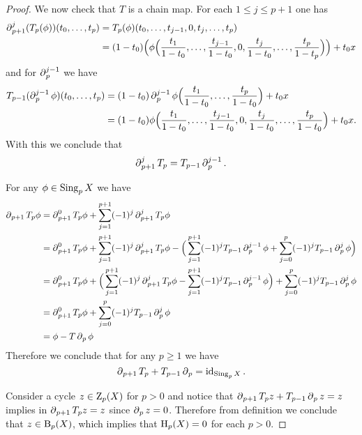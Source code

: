 \begin{proof}
We now check that \(T\) is a chain map. For each
\(1 \leq j \leq p+1\) one has
\begin{align*}
  \operatorname{\partial}_{p+1}^j (T_p(\phi))(t_0, \dots, t_p)
  &= T_p(\phi)(t_0, \dots, t_{j-1}, 0, t_j, \dots, t_p) \\
  &= (1 - t_0) \Big(
      \phi\Big(
      \frac{t_{1}}{1 - t_{0}}, \dots, \frac{t_{j-1}}{1 - t_0}, 0,
      \frac{t_{j}}{1 - t_0}, \dots, \frac{t_{p}}{1 - t_{p}}
      \Big)
    \Big) + t_0 x
\end{align*}
and for \(\operatorname{\partial}_p^{j-1}\) we have
\begin{align*}
  T_{p-1}(\operatorname{\partial}_p^{j-1} \phi)(t_0, \dots, t_{p})
  &= (1 - t_0) \operatorname{\partial}_p^{j-1} \phi\Big(
      \frac{t_{1}}{1 - t_0}, \dots, \frac{t_{p}}{1 - t_{0}}
    \Big) + t_0 x \\
  &= (1 - t_0) \phi\Big(
      \frac{t_{1}}{1 - t_{0}}, \dots, \frac{t_{j-1}}{1 - t_{0}}, 0,
      \frac{t_j}{1 - t_0}, \dots, \frac{t_{p}}{1 - t_0}
    \Big) + t_0 x.
\end{align*}
With this we conclude that
\[
\operatorname{\partial}_{p+1}^j T_p = T_{p-1} \operatorname{\partial}_p^{j-1}.
\]

For any \(\phi \in \operatorname{Sing}_p X\) we have
\begin{align*}
  \operatorname{\partial}_{p+1} T_p \phi
  &= \operatorname{\partial}_{p+1}^0 T_p \phi + \sum_{j=1}^{p+1} (-1)^j \operatorname{\partial}_{p+1}^j T_p \phi \\
  &= \operatorname{\partial}_{p+1}^0 T_p \phi + \sum_{j=1}^{p+1} (-1)^j \operatorname{\partial}_{p+1}^j T_p \phi
    - \Big(
      \sum_{j=1}^{p+1} (-1)^j T_{p-1} \operatorname{\partial}_p^{j-1} \phi
      + \sum_{j=0}^p (-1)^j T_{p-1} \operatorname{\partial}_p^j \phi
    \Big) \\
  &= \operatorname{\partial}_{p+1}^0 T_p \phi + \Big(
      \sum_{j=1}^{p+1} (-1)^j \operatorname{\partial}_{p+1}^j T_p \phi
      - \sum_{j=1}^{p+1} (-1)^j T_{p-1} \operatorname{\partial}_p^{j-1} \phi
    \Big) + \sum_{j=0}^p (-1)^j T_{p-1} \operatorname{\partial}_p^j \phi \\
  &= \operatorname{\partial}_{p+1}^0 T_p \phi + \sum_{j=0}^p (-1)^j T_{p-1} \operatorname{\partial}_p^j \phi \\
  &= \phi - T \operatorname{\partial}_p \phi
\end{align*}
Therefore we conclude that for any \(p \geq 1\) we have
\[
\operatorname{\partial}_{p+1} T_p + T_{p-1} \operatorname{\partial}_p = \operatorname{id}_{\operatorname{Sing}_p X}.
\]

Consider a cycle \(z \in \operatorname{Z}_p(X)\) for \(p > 0\) and notice that
\(\operatorname{\partial}_{p+1} T_p z + T_{p-1} \operatorname{\partial}_p z = z\) implies in
\(\operatorname{\partial}_{p+1} T_p z = z\) since \(\operatorname{\partial}_p z = 0\). Therefore from definition we
conclude that \(z \in \operatorname{B}_p(X)\), which implies that \(\operatorname{H}_p(X) = 0\) for each
\(p > 0\).
\end{proof}

